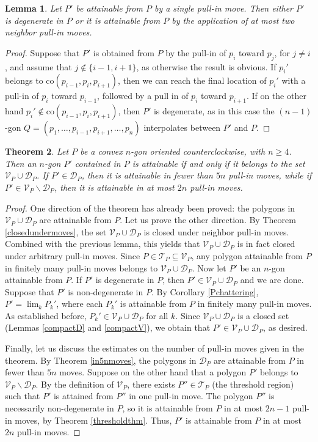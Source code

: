 \documentclass[11pt]{amsart}
\newtheorem{theorem}{Theorem}[section]
\newtheorem{lemma}[theorem]{Lemma}
\theoremstyle{remark}
\numberwithin{equation}{section}
\newcommand{\co}{\mathrm{co}}
\newcommand{\D}{\mathcal{D}}
\newcommand{\TT}{\mathcal{T}}
\newcommand{\V}{\mathcal{V}}
\renewcommand{\geq}{\geqslant}
\begin{document}
\begin{lemma}
Let $P'$ be attainable from $P$ by a single pull-in move. Then either $P'$ is degenerate in $P$ or it is attainable from
$P$ by the application of at most two neighbor pull-in moves.
\end{lemma}

\begin{proof}
Suppose that $P'$ is obtained from $P$ by the pull-in of $p_i$ toward $p_j$, for $j\neq i$, and assume that $j\notin \{i-1,i+1\}$, as otherwise the result is obvious. If $p_i'$ belongs to $\co(p_{i-1},p_i,p_{i+1})$, then we can reach 
the final location of $p_i'$ with a pull-in of $p_i$ toward $p_{i-1}$, followed by a pull in of $p_i$ toward $p_{i+1}$. If on the other hand $p_i'\notin \co(p_{i-1},p_i,p_{i+1})$, then  $P'$ is degenerate, as in this case the $(n-1)$-gon $Q=(p_1,\ldots,p_{i-1},p_{i+1},\ldots,p_n)$ interpolates between $P'$ and $P$.
\end{proof}


\begin{theorem}\label{attainableVuD}
Let $P$ be a convex $n$-gon oriented counterclockwise, with $n\geq 4$. Then an $n$-gon $P'$ contained in $P$ is attainable if and only if
it belongs to the set $\V_P\cup \D_P$. If $P'\in \D_P$, then it is attainable in fewer than $5n$ pull-in moves, while if $P'\in \V_P\backslash \D_P$, then it is attainable in at most $2n$ pull-in moves. 
\end{theorem}

\begin{proof}
One direction of the theorem has already been proved: the polygons in $\V_P\cup\D_P$ are attainable from $P$.
Let us prove the other direction. By Theorem \ref{closedundermoves}, the set $\V_P\cup \D_P$ is closed under neighbor pull-in moves. Combined with the previous lemma, this yields that $\V_P\cup \D_P$ is in fact closed under arbitrary pull-in moves. Since $P\in \TT_P\subseteq \V_P$, any polygon attainable from $P$ in finitely many pull-in moves belongs to $\V_P\cup \D_P$. Now let $P'$ be an $n$-gon attainable from $P$. If $P'$ is degenerate in $P$, then $P'\in \V_P\cup \D_P$ and we are done. Suppose that $P'$ is non-degenerate in $P$. By Corollary \ref{Pchattering}, $P'=\lim_k P_k'$, where  each $P_k'$ is attainable from $P$ in finitely many pull-in moves. As established before, $P_k'\in \V_P\cup \D_P$ for all $k$. Since  $\V_P\cup\D_P$ is a closed set (Lemmas \ref{compactD} and \ref{compactV}), we obtain that $P'\in \V_P\cup\D_P$, as desired. 

Finally, let us discuss the estimates on the number of pull-in moves given in the theorem. 
By Theorem \ref{in5nmoves}, the polygons in $\D_P$ are attainable from $P$ in fewer than $5n$ moves. Suppose on the other hand that a polygon $P'$ belongs to $\V_P\backslash \D_P$. By the definition of $\V_P$, there exists $P''\in \TT_P$ (the threshold region)
such that $P'$ is attained from $P''$ in one pull-in move. The polygon $P''$ is necessarily non-degenerate in $P$, so it is attainable from $P$ in at most $2n-1$ pull-in moves, by Theorem \ref{thresholdthm}. Thus, $P'$ is attainable from $P$ in at most $2n$ pull-in moves.
\end{proof}
\end{document}
